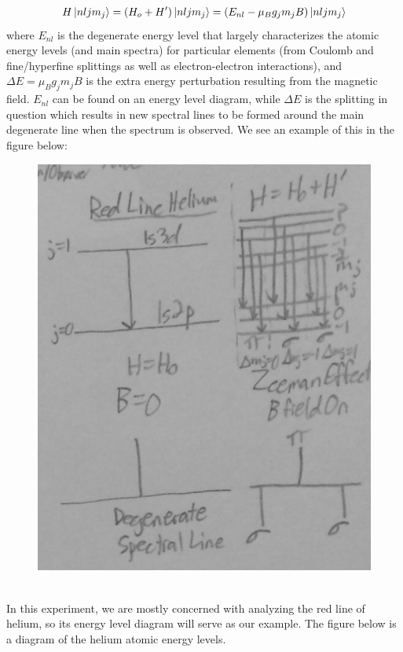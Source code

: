 \documentclass{article}
\begin{document}
    \begin{equation}
        H \ket{nljm_j} = (H_o + H')\ket{nljm_j} = (E_{nl} - \mu_B g_j m_j B)\ket{nljm_j}
    \end{equation}
    where $E_{nl}$ is the degenerate energy level that largely characterizes the atomic energy levels (and main spectra) for particular elements (from Coulomb and fine/hyperfine splittings as well as electron-electron interactions), and $\Delta E = \mu_B g_j m_j B$ is the extra energy perturbation resulting from the magnetic field. $E_{nl}$ can be found on an energy level diagram, while $\Delta E$ is the splitting in question which results in new spectral lines to be formed around the main degenerate line when the spectrum is observed. We see an example of this in the figure below:\\
    \begin{figure}[H]
    \centering
    \includegraphics[scale = 0.2]{ATM1d.jpg}
    \caption{}
    \label{fig:my_label}
\end{figure}\\
    In this experiment, we are mostly concerned with analyzing the red line of helium, so its energy level diagram will serve as our example. The figure below is a diagram of the helium atomic energy levels.\\
\end{document}
